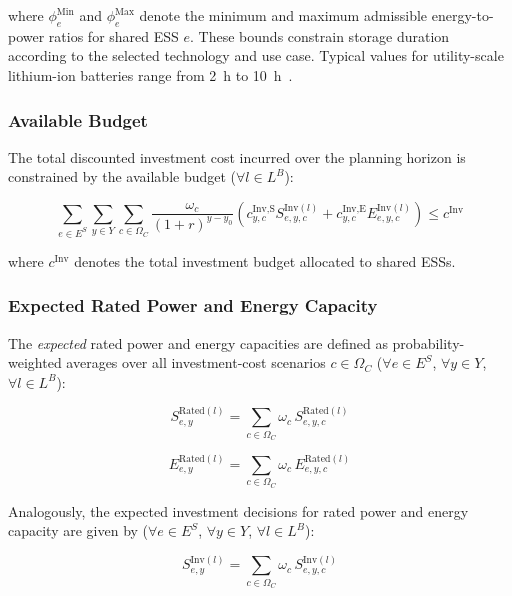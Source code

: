 \documentclass[preprint,12pt]{elsarticle}
\begin{document}
\noindent
where 
$\phi^{\text{Min}}_e$ and $\phi^{\text{Max}}_e$ denote the minimum and maximum admissible energy-to-power ratios for shared ESS $e$. 
These bounds constrain storage duration according to the selected technology and use case. Typical values for utility-scale lithium-ion batteries range from 2~h to 10~h~\cite{nrel_ess_costs}.

\subsubsection{Available Budget}

The total discounted investment cost incurred over the planning horizon is constrained by the available budget ($\forall l \in L^B$):

\begin{equation}
    \sum_{e \in E^S} \sum_{y \in Y} \sum_{c \in \Omega_C} 
    \frac{\omega_c}{(1 + r)^{y - y_0}}
    \left(
        c^{\text{Inv,S}}_{y,c} S^{\text{Inv}(l)}_{e,y,c}
        + 
        c^{\text{Inv,E}}_{y,c} E^{\text{Inv}(l)}_{e,y,c}
    \right)
    \leq c^{\text{Inv}}
\end{equation}

\noindent
where $c^{\text{Inv}}$ denotes the total investment budget allocated to shared ESSs.

\subsubsection{Expected Rated Power and Energy Capacity}

The \textit{expected} rated power and energy capacities are defined as probability-weighted averages over all investment-cost scenarios $c \in \Omega_C$ ($\forall e \in E^S$, $\forall y \in Y$, $\forall l \in L^B$):

\begin{equation}
    S^{\text{Rated}(l)}_{e,y} = \sum_{c \in \Omega_C} \omega_c \, S^{\text{Rated}(l)}_{e,y,c}
\end{equation}

\begin{equation}
    E^{\text{Rated}(l)}_{e,y} = \sum_{c \in \Omega_C} \omega_c \, E^{\text{Rated}(l)}_{e,y,c}
\end{equation}

Analogously, the expected investment decisions for rated power and energy capacity are given by ($\forall e \in E^S$, $\forall y \in Y$, $\forall l \in L^B$):

\begin{equation}
    S^{\text{Inv}(l)}_{e,y} = \sum_{c \in \Omega_C} \omega_c \, S^{\text{Inv}(l)}_{e,y,c}
\end{equation}
\end{document}
